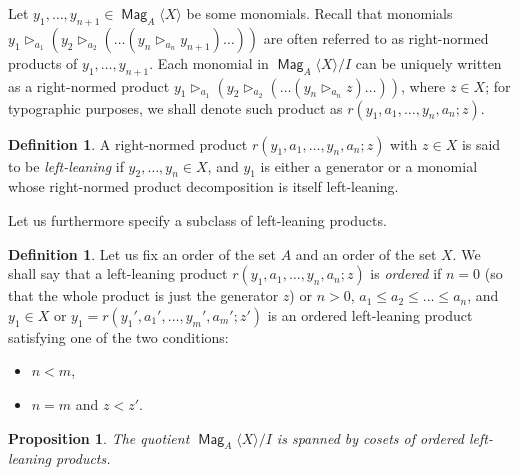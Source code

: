 \documentclass[10pt,a4paper]{article}
\newtheorem{prop}[theo]{Proposition}
\theoremstyle{definition}
\newtheorem{defi}[theo]{Definition}
\numberwithin{equation}{section}
\numberwithin{figure}{section}
\DeclareMathOperator{\Mag}{\mathsf{Mag}}
\begin{document}
Let $y_1,\dots,y_{n+1}\in \Mag_A\langle X\rangle$ be some monomials. Recall that monomials $y_1\triangleright_{a_1} (y_2\triangleright_{a_2} (\dots (y_n\triangleright_{a_n} y_{n+1}) \dots))$ are often referred to as right-normed products of $y_1,\dots,y_{n+1}$. Each monomial in $\Mag_A\langle X\rangle/I$ can be uniquely written as a right-normed product $y_1\triangleright_{a_1} (y_2\triangleright_{a_2} (\dots (y_n\triangleright_{a_n} z) \dots))$, where $z\in X$; for typographic purposes, we shall denote such product as $r(y_1,a_1,\dots,y_n,a_n;z)$.

\begin{defi}\label{leaning}
A right-normed product $r(y_1,a_1,\dots,y_n,a_n;z)$ with $z\in X$ is said to be \emph{left-leaning} if $y_2,\dots,y_n\in X$, and $y_{1}$ is either a generator or a monomial whose right-normed product decomposition is itself left-leaning.
\end{defi}

Let us furthermore specify a subclass of left-leaning products.

\begin{defi}\label{ordered}
Let us fix an order of the set $A$ and an order of the set $X$. We shall say that a left-leaning product $r(y_1,a_1,\dots,y_n,a_n;z)$ is \emph{ordered} if $n=0$ (so that the whole product is just the generator $z$) or $n>0$, $a_1\le a_2\le\dots\le a_n$, and\pagebreak{} $y_1\in X$ or $y_1=r(y_1',a_1',\dots,y_m',a_m';z')$ is an ordered left-leaning product satisfying one of the two conditions:
\begin{itemize}
\item $n<m$,
\item $n=m$ and $z<z'$.
\end{itemize}
\end{defi}

\begin{prop}\label{prop:ordright}
The quotient $\Mag_A\langle X\rangle/I$ is spanned by cosets of ordered left-leaning products.
\end{prop}
\end{document}
